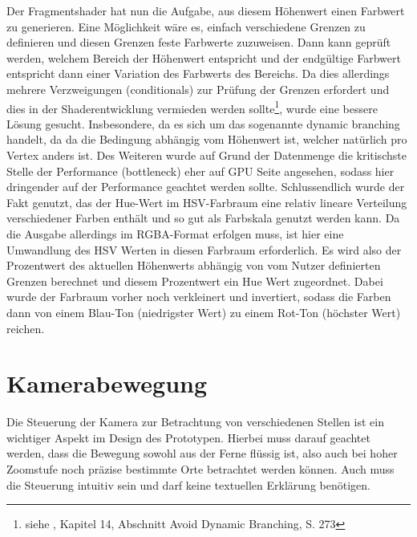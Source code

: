 Der Fragmentshader hat nun die Aufgabe, aus diesem Höhenwert einen Farbwert zu generieren. Eine Möglichkeit wäre es, einfach verschiedene Grenzen zu definieren und diesen Grenzen feste Farbwerte zuzuweisen. Dann kann geprüft werden, welchem Bereich der Höhenwert entspricht und der endgültige Farbwert entspricht dann einer Variation des Farbwerts des Bereichs. Da dies allerdings mehrere Verzweigungen (conditionals) zur Prüfung der Grenzen erfordert und dies in der Shaderentwicklung vermieden werden sollte\footnote{siehe \cite{shaderDev}, Kapitel 14, Abschnitt Avoid Dynamic Branching, S. 273}, wurde eine bessere Lösung gesucht. Insbesondere, da es sich um das sogenannte dynamic branching handelt, da da die Bedingung abhängig vom Höhenwert ist, welcher natürlich pro Vertex anders ist. Des Weiteren wurde auf Grund der Datenmenge die kritischste Stelle der Performance (bottleneck) eher auf GPU Seite angesehen, sodass hier dringender auf der Performance geachtet werden sollte. Schlussendlich wurde der Fakt genutzt, das der Hue-Wert im HSV-Farbraum eine relativ lineare Verteilung verschiedener Farben enthält und so gut als Farbskala genutzt werden kann. Da die Ausgabe allerdings im RGBA-Format erfolgen muss, ist hier eine Umwandlung des HSV Werten in diesen Farbraum erforderlich. Es wird also der Prozentwert des aktuellen Höhenwerts abhängig von vom Nutzer definierten Grenzen berechnet und diesem Prozentwert ein Hue Wert zugeordnet. Dabei wurde der Farbraum vorher noch verkleinert und invertiert, sodass die Farben dann von einem Blau-Ton (niedrigster Wert) zu einem Rot-Ton (höchster Wert) reichen. 

\section{Kamerabewegung}
Die Steuerung der Kamera zur Betrachtung von verschiedenen Stellen ist ein wichtiger Aspekt im Design des Prototypen. Hierbei muss darauf geachtet werden, dass die Bewegung sowohl aus der Ferne flüssig ist, also auch bei hoher Zoomstufe noch präzise bestimmte Orte betrachtet werden können. Auch muss die Steuerung intuitiv sein und darf keine textuellen Erklärung benötigen.


